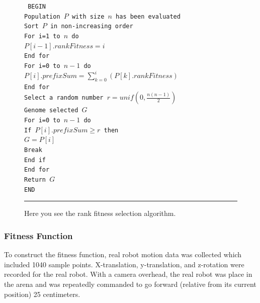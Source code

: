 \begin{figure}[htbp]
\begin{center}
\begin{varwidth}{\textwidth}
{\tt
BEGIN \\
\tab Population $P$ with size $n$ has been evaluated \\
\tab Sort $P$ in non-increasing order \\
\tab For i=1 to $n$ do \\
\tab \tab $P[i-1].rankFitness = i$ \\
\tab End for \\
\tab For i=0 to $n-1$ do \\
\tab \tab $P[i].prefixSum = \sum\limits_{k=0}^i(P[k].rankFitness)$ \\
\tab End for \\
\tab Select a random number $r=unif\left(0,\frac{n(n-1)}{2}\right)$ \\
\tab Genome selected $G$ \\
\tab For i=0 to $n-1$ do \\
\tab \tab If $P[i].prefixSum \geq r $ then \\
\tab \tab \tab $G=P[i]$ \\
\tab \tab \tab Break \\
\tab \tab End if \\
\tab End for \\
\tab Return $G$ \\
END \\
}
\end{varwidth}
\end{center}
\centering
\rule{35em}{0.5pt}
\caption[Rank Fitness Selection Algorithm]{Here you see the rank fitness selection algorithm.}
\label{fig:rank_fitness_selection}
\end{figure}

\subsubsection{Fitness Function}


To construct the fitness function, real robot motion data was collected which included 1040 sample points. X-translation, y-translation, and z-rotation were recorded for the real robot. With a camera overhead, the real robot was place in the arena and was repeatedly commanded to go forward (relative from its current position) 25 centimeters. 

